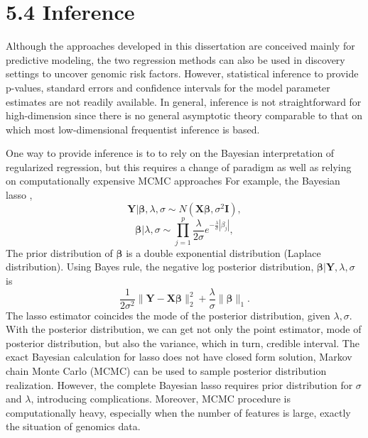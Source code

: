 \section*{5.4 \hspace{0.25cm} Inference}
Although the approaches developed in this dissertation are conceived mainly for predictive modeling, the two regression methods can also be used in discovery settings to uncover genomic risk factors. However, statistical inference to provide p-values, standard errors and confidence intervals for the model parameter estimates are not readily available. In general, inference is not straightforward for high-dimension since there is no general asymptotic theory comparable to that on which most low-dimensional frequentist inference is based. 

One way to provide inference is to to rely on the Bayesian interpretation of regularized regression, but this requires a change of paradigm as well as relying on computationally expensive MCMC approaches For example, the Bayesian lasso \citep{park2008bayesian},
\begin{displaymath}
\bm{Y}|\bm{\beta}, \lambda,\sigma \sim N(\bm{X\beta}, \sigma^2\bm{I}),
\end{displaymath}
\begin{displaymath}
\bm{\beta}|\lambda,\sigma \sim \prod_{j=1}^p \frac{\lambda}{2\sigma}e^{-\frac{\lambda}{\sigma}|\beta_j|},
\end{displaymath}
The prior distribution of $\bm{\beta}$ is a double exponential distribution (Laplace distribution). Using Bayes rule, the negative log posterior distribution, $\bm{\beta}|\bm{Y},\lambda,\sigma$ is 
\begin{displaymath}
\frac{1}{2\sigma^2} \|\bm{Y}-\bm{X\beta}\|_2^2+\frac{\lambda}{\sigma}\|\bm{\beta}\|_1.
\end{displaymath}
The lasso estimator coincides the mode of the posterior distribution, given $\lambda,\sigma$. With the posterior distribution, we can get not only the point estimator, mode of posterior distribution, but also the variance, which in turn, credible interval. The exact Bayesian calculation for lasso does not have closed form solution, Markov chain Monte Carlo (MCMC) can be used to sample posterior distribution realization. However, the complete Bayesian lasso requires prior distribution for $\sigma$ and $\lambda$, introducing complications. Moreover, MCMC procedure is computationally heavy, especially when the number of features is large, exactly the situation of genomics data. 

